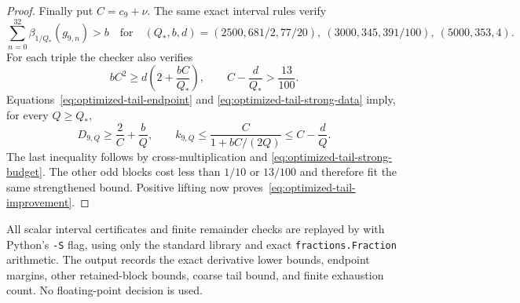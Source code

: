 \begin{proof}
Finally put $C=c_9+\nu$. The same exact interval rules verify
\begin{equation}\label{eq:optimized-tail-strong-data}
 \sum_{n=0}^{32}\beta_{1/Q_*}(g_{9,n})>b
 \quad\text{for}\quad
 (Q_*,b,d)=(2500,681/2,77/20),\ (3000,345,391/100),\ (5000,353,4).
\end{equation}
For each triple the checker also verifies
\begin{equation}\label{eq:optimized-tail-strong-budget}
 bC^2\ge d\left(2+\frac{bC}{Q_*}\right),
 \qquad C-\frac d{Q_*}>\frac{13}{100}.
\end{equation}
Equations~\eqref{eq:optimized-tail-endpoint} and
\eqref{eq:optimized-tail-strong-data} imply, for every $Q\ge Q_*$,
\begin{equation}
 D_{9,Q}\ge\frac2C+\frac bQ,
 \qquad k_{9,Q}\le\frac{C}{1+bC/(2Q)}\le C-\frac dQ.
\end{equation}
The last inequality follows by cross-multiplication and
\eqref{eq:optimized-tail-strong-budget}. The other odd blocks cost less than
$1/10$ or $13/100$ and therefore fit the same strengthened bound. Positive
lifting now proves~\eqref{eq:optimized-tail-improvement}.
\end{proof}

All scalar interval certificates and finite remainder checks are replayed
by  with Python's \texttt{-S}
flag, using only the standard library and exact
\texttt{fractions.Fraction} arithmetic. The output
 records the exact derivative
lower bounds, endpoint margins, other retained-block bounds, coarse tail
bound, and finite exhaustion count. No floating-point decision is used.
